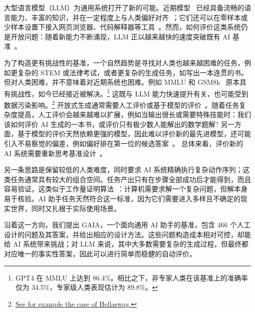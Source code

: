 \documentclass{fairmeta}
\newcommand{\benchmark}{\textsc{GAIA}}
\newcommand{\total}{466}
\begin{document}
大型语言模型（LLM）为通用系统打开了新的可能。近期模型~\citep{openai2023gpt4, anthropic2023claude2, anil2023palm, touvron2023llama2} 已经具备流畅的语言能力、丰富的知识，并在一定程度上与人类偏好对齐~\citep{ouyang2022training}；它们还可以在零样本或少样本设置下接入网页浏览器、代码解释器等工具~\citep{mialon2023augmented,brown2020language}。然而，如何评价这类系统仍是开放问题：随着新能力不断涌现，LLM 正以越来越快的速度突破既有 AI 基准~\citep{_kiela-etal-2023-plottingprogress}。

 
为了构造更有挑战性的基准，一个自然趋势是寻找对人类也越来越困难的任务，例如更复杂的 STEM 或法律考试，或者更复杂的生成任务，如写出一本连贯的书。但对人类困难，并不意味着对近期系统也困难。例如 MMLU 和 GSM8k~\citep{_hendrycks-etal-2021-measuring-mmlu, cobbe2021training} 原本具有挑战性，如今已经接近被解决。\footnote{GPT4 在 MMLU 上达到 86.4\%。相比之下，非专家人类在该基准上的准确率仅为 34.5\%，专家级人类表现估计为 89.8\%。} 这既与 LLM 能力快速提升有关，也可能受到数据污染影响。\footnote{\href{https://www.surgehq.ai/blog/hellaswag-or-hellabad-36-of-this-popular-llm-benchmark-contains-errors}{See for example the case of Hellaswag.}}
开放式生成通常需要人工评价或基于模型的评价~\citep{zheng2023judging}。随着任务复杂度提高，人工评价会越来越难以扩展，例如当输出很长或需要特殊技能时：我们该如何评价 AI 生成的一本书，或评价只有极少数人能解出的数学题解? 另一方面，基于模型的评价天然依赖更强的模型，因此难以评价新的最先进模型，还可能引入不易察觉的偏差，例如偏好排在第一位的候选答案~\citep{zheng2023judging}。
总体来看，评价新的 AI 系统需要重新思考基准设计~\citep{chollet2019measure}。

另一条思路是保留较低的人类难度，同时要求 AI 系统精确执行复杂动作序列；这类任务通常具有较大的组合空间。任务产出只有在步骤全部成功后才能得到，而且容易验证，这类似于工作量证明算法~\citep{jakobsson1999proofs,dwork1993pricing}：计算机需要求解一个复杂问题，但解本身易于核验。AI 助手任务天然符合这一标准，因为它们需要进入多样且不确定的现实世界，同时又扎根于实际使用场景。

沿着这一方向，我们提出 \benchmark{}，一个面向通用 AI 助手的基准，包含 \total{} 个人工设计的问题及其答案，并给出相应的设计方法。这些问题构造成本相对可控，却能给 AI 系统带来挑战；对 LLM 来说，其中大多数需要复杂的生成过程，但最终都对应唯一的事实性答案，因此可以进行简单而稳健的自动评价。
\end{document}
